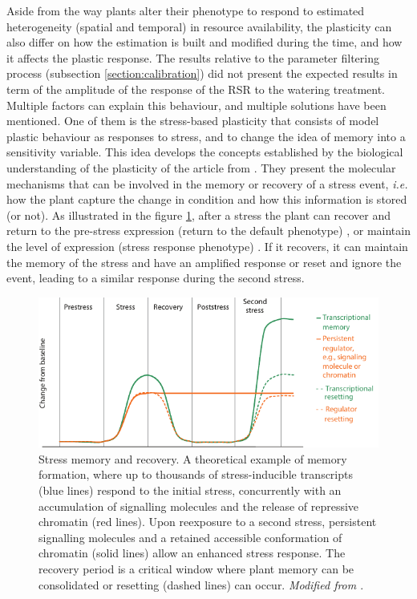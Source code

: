 Aside from the way plants alter their phenotype to respond to estimated heterogeneity (spatial and temporal) in resource availability, the plasticity can also differ on how the estimation is built and modified during the time, and how it affects the plastic response. The results relative to the parameter filtering process (subsection \ref{section:calibration}) did not present the expected results in term of the amplitude of the response of the RSR to the watering treatment. Multiple factors can explain this behaviour, and multiple solutions have been mentioned. One of them is the stress-based plasticity that consists of model plastic behaviour as responses to stress, and to change the idea of memory into a sensitivity variable. This idea develops the concepts established by the biological understanding of the plasticity of the article from \cite{crisp_reconsidering_2016}. They present the molecular mechanisms that can be involved in the memory or recovery of a stress event, \textit{i.e.} how the plant capture the change in condition and how this information is stored (or not). As illustrated in the figure \ref{fig:stress_memory}, after a stress the plant can recover and return to the pre-stress expression (return to the default phenotype) \parencite{liu_biomass_2004}, or maintain the level of expression (stress response phenotype) \parencite{peterson_growth_1982}. If it recovers, it can maintain the memory of the stress and have an amplified response or reset and ignore the event, leading to a similar response during the second stress.



\begin{figure}\label{fig:stress_memory}
\includegraphics[width = \textwidth]{./2_PP/Figures/Concepts/stress_memory.pdf}
\caption[Stress memory and recovery]{Stress memory and recovery. A theoretical example of memory formation, where up to thousands of stress-inducible transcripts (blue lines) respond to the initial stress, concurrently with an accumulation of signalling molecules and the release of repressive chromatin (red lines). Upon reexposure to a second stress, persistent signalling molecules and a retained accessible conformation of chromatin (solid lines) allow an enhanced stress response. The recovery period is a critical window where plant memory can be consolidated or resetting (dashed lines) can occur. \textit{Modified from \cite{crisp_reconsidering_2016}}.}
\end{figure}

